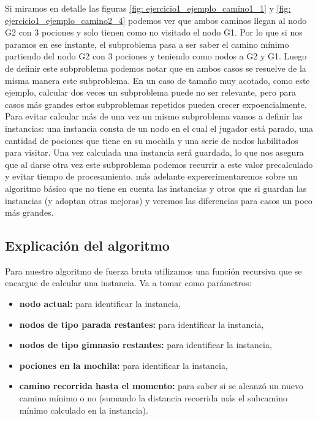 \par Si miramos en detalle las figuras \ref{fig: ejercicio1_ejemplo_camino1_1} y \ref{fig: ejercicio1_ejemplo_camino2_4} podemos ver que ambos caminos llegan al nodo G2 con 3 pociones y solo tienen como no visitado el nodo G1. Por lo que si nos paramos en ese instante, el subproblema pasa a ser saber el camino mínimo partiendo del nodo G2 con 3 pociones y teniendo como nodos a G2 y G1. Luego de definir este subproblema podemos notar que en ambos casos se resuelve de la misma manera este subproblema. En un caso de tamaño muy acotado, como este ejemplo, calcular dos veces un subproblema puede no ser relevante, pero para casos más grandes estos subproblemas repetidos pueden crecer expoencialmente. Para evitar calcular más de una vez un mismo subproblema vamos a definir las instancias: una instancia consta de un nodo en el cual el jugador está parado, una cantidad de pociones que tiene en su mochila y una serie de nodos habilitados para visitar. Una vez calculada una instancia será guardada, lo que nos asegura que al darse otra vez este subproblema podemos recurrir a este valor precalculado y evitar tiempo de procesamiento. más adelante expererimentaremos sobre un algoritmo básico que no tiene en cuenta las instancias y otros que si guardan las instancias (y adoptan otras mejoras) y veremos las diferencias para casos un poco más grandes.

\subsection{Explicación del algoritmo}

\par Para nuestro algoritmo de fuerza bruta utilizamos una función recursiva que se encargue de calcular una instancia. Va a tomar como parámetros:

\begin{itemize}
	\item \textbf{nodo actual:} para identificar la instancia,
	\item \textbf{nodos de tipo parada restantes:} para identificar la instancia,
	\item \textbf{nodos de tipo gimnasio restantes:} para identificar la instancia,
	\item \textbf{pociones en la mochila:} para identificar la instancia,
	\item \textbf{camino recorrida hasta el momento:} para saber si se alcanzó un nuevo camino mínimo o no (sumando la distancia recorrida más el subcamino mínimo calculado en la instancia).
\end{itemize}

